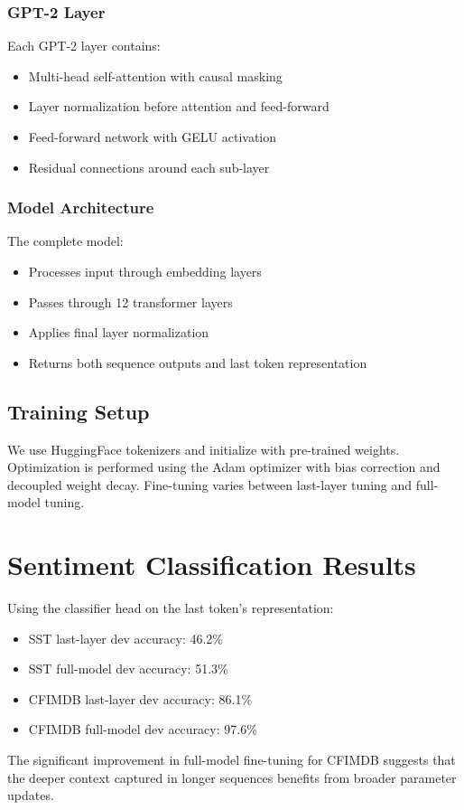 \documentclass{article}
\begin{document}
\subsubsection{GPT-2 Layer}
Each GPT-2 layer contains:
\begin{itemize}
\item Multi-head self-attention with causal masking
\item Layer normalization before attention and feed-forward
\item Feed-forward network with GELU activation
\item Residual connections around each sub-layer
\end{itemize}

\subsubsection{Model Architecture}
The complete model:
\begin{itemize}
\item Processes input through embedding layers
\item Passes through 12 transformer layers
\item Applies final layer normalization
\item Returns both sequence outputs and last token representation
\end{itemize}

\subsection{Training Setup}
We use HuggingFace tokenizers and initialize with pre-trained weights. Optimization is performed using the Adam optimizer with bias correction and decoupled weight decay. Fine-tuning varies between last-layer tuning and full-model tuning.

\section{Sentiment Classification Results}
Using the classifier head on the last token's representation:
\begin{itemize}
\item SST last-layer dev accuracy: 46.2\%
\item SST full-model dev accuracy: 51.3\%
\item CFIMDB last-layer dev accuracy: 86.1\%
\item CFIMDB full-model dev accuracy: 97.6\%
\end{itemize}
The significant improvement in full-model fine-tuning for CFIMDB suggests that the deeper context captured in longer sequences benefits from broader parameter updates.
\end{document}
